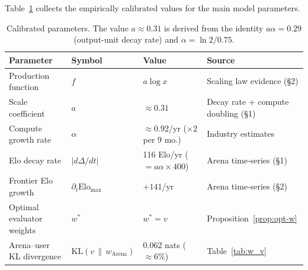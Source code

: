 \documentclass{article}
\theoremstyle{definition}
\begin{document}
Table~\ref{tab:params} collects the empirically calibrated values for the
main model parameters.

\begin{table}[h]
\centering
\begin{tabular}{llll}
\toprule
Parameter & Symbol & Value & Source \\
\midrule
Production function & $f$ & $a\log x$ & Scaling law evidence (\S2) \\
Scale coefficient & $a$ & $\approx 0.31$ & Decay rate + compute doubling (\S1) \\
Compute growth rate & $\alpha$ & $\approx 0.92$/yr ($\times 2$ per 9 mo.) & Industry estimates \\
Elo decay rate & $|d\Delta/dt|$ & 116 Elo/yr ($= a\alpha \times 400$) & Arena time-series (\S1) \\
Frontier Elo growth & $\partial_t \text{Elo}_{\max}$ & $+141$/yr & Arena time-series (\S2) \\
Optimal evaluator weights & $w^*$ & $w^* = v$ & Proposition~\ref{prop:opt-w} \\
Arena--user KL divergence & $\mathrm{KL}(v\,\|\,w_\text{Arena})$ & 0.062 nats ($\approx 6\%$) & Table~\ref{tab:w_v} \\
\bottomrule
\end{tabular}
\caption{Calibrated parameters. The value $a \approx 0.31$ is derived from the
identity $a\alpha = 0.29$ (output-unit decay rate) and $\alpha = \ln 2/0.75$.}
\label{tab:params}
\end{table}
\end{document}
